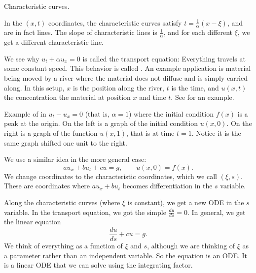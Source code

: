 \begin{example}
\begin{mywrapfig}{2.8in}
\capstart
{}
\caption{Characteristic curves.\label{fopde:charcurves}}
\end{mywrapfig}

In the $(x,t)$ coordinates, the characteristic curves satisfy 
$t = \frac{1}{\alpha} ( x- \xi)$, and are in fact lines.
The slope of characteristic lines is
$\frac{1}{\alpha}$, and for each different $\xi$, we get a different
characteristic line.

We see why $u_t + \alpha u_x = 0$ is called the
transport equation: Everything travels at some constant speed.
This behavior is called \emph{}.
An example application is material being moved by a river where the material
does not diffuse and is simply carried along.  In this setup, $x$ is 
the position along the river, $t$ is the time, and $u(x,t)$ the concentration the
material at position $x$ and time $t$.  See
 for an example.
\begin{myfig}
\capstart
\caption{Example of 
in $u_t-u_x = 0$ (that is, $\alpha = 1$) where the
initial condition $f(x)$ is a peak at the origin.  On the left is a graph
of the initial condition $u(x,0)$.  On the right is a graph of
the function $u(x,1)$, that is at time $t=1$.  Notice it is the same
graph shifted one unit to
the right.\label{fopde:transportfig}}
\end{myfig}
\end{example}

We use a similar idea in the more general case:
\begin{equation*}
a u_x + b u_t + c u = g, \qquad u(x,0) = f(x)  .
\end{equation*}
We change coordinates to the
characteristic coordinates, which we call $(\xi,s)$.
These are coordinates where $a u_x + b u_t$ becomes differentiation
in the $s$ variable.

Along the characteristic curves (where $\xi$ is constant), we get a
new ODE in the $s$ variable.  In the transport
equation, we got the simple $\frac{du}{ds} = 0$.  In general,
we get the linear equation
\begin{equation} \label{eq:fopde:charode}
\frac{du}{ds} + c u = g.
\end{equation}
We think of everything as a function of $\xi$ and $s$,
although
we are thinking of $\xi$ as a parameter rather than an independent variable.
So the equation is an ODE\@.  It is a linear
ODE that we can solve using the integrating factor.

